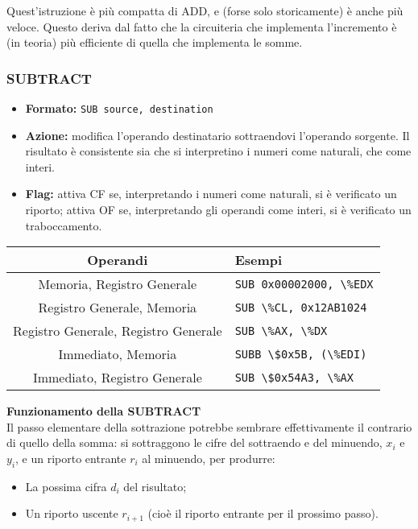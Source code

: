 \documentclass[a4paper,11pt]{article}
\begin{document}
Quest'istruzione è più compatta di ADD, e (forse solo storicamente) è anche più veloce.
Questo deriva dal fatto che la circuiteria che implementa l'incremento è (in teoria) più efficiente di quella che implementa le somme.

\subsubsection{SUBTRACT}
\begin{itemize}
	\item \textbf{Formato:} \lstinline|SUB source, destination|
	\item \textbf{Azione:} modifica l'operando destinatario sottraendovi l'operando sorgente. 
		Il risultato è consistente sia che si interpretino i numeri come naturali, che come interi.
	\item \textbf{Flag:} attiva CF se, interpretando i numeri come naturali, si è verificato un riporto; attiva OF se, interpretando gli operandi come interi, si è verificato un traboccamento.
\end{itemize}

		\begin{table}[H]
			\center {}
			\begin{tabular} { c | p{5cm} }
				\bfseries Operandi & \bfseries Esempi \\
				\hline
				Memoria, Registro Generale & \lstinline|SUB 0x00002000, \%EDX| \\ 
				Registro Generale, Memoria & \lstinline|SUB \%CL, 0x12AB1024| \\ 
				Registro Generale, Registro Generale & \lstinline|SUB \%AX, \%DX| \\ 
				Immediato, Memoria & \lstinline|SUBB \$0x5B, (\%EDI)| \\ 
				Immediato, Registro Generale & \lstinline|SUB \$0x54A3, \%AX|
			\end{tabular}
		\end{table}

\par\medskip
\noindent
\textbf{\textsf{Funzionamento della SUBTRACT}} \\
Il passo elementare della sottrazione potrebbe sembrare effettivamente il contrario di quello della somma: si sottraggono le cifre del sottraendo e del minuendo, $x_i$ e $y_i$, e un riporto entrante $r_i$ al minuendo, per produrre:
	\begin{itemize}
		\item La possima cifra $d_i$ del risultato;
		\item Un riporto uscente $r_{i+1}$ (cioè il riporto entrante per il prossimo passo).
	\end{itemize}
\end{document}
